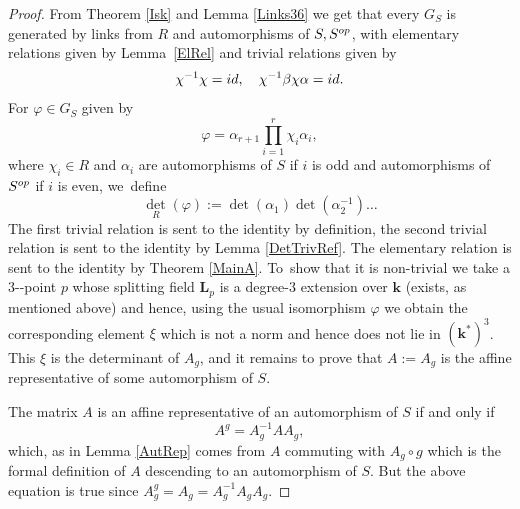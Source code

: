 \documentclass[10pt,a4paper]{amsart}
\providecommand{\nobreakdash}{\nobreak\hbox{-}}
\newcommand{\id}{\textup{id}}
\newcommand{\op}{\textup{op}}
\theoremstyle{definition}
\newcommand{\kk}{{\boldsymbol{k}}}
\newcommand{\LL}{{\boldsymbol{L}}}
\begin{document}
\begin{proof}
From Theorem \ref{Isk} and Lemma \ref{Links36} we get that every $G_S$ is generated by links from $R$ and automorphisms of $S,S^{\op}$, with elementary relations given by Lemma~\ref{ElRel} and trivial relations given by
\[
\chi^{-1} \chi = \id, \quad\chi^{-1} \beta \chi \alpha = \id.
\]
For $\varphi \in G_S$ given by
\[
\varphi = \alpha_{r+1}\prod_{i=1}^r\chi_i \alpha_i,
\]
where $\chi_i \in R$ and $\alpha_i$ are automorphisms of $S$ if $i$ is odd and automorphisms of $S^{\op}$ if $i$ is even, we~define
\[
\det_R(\varphi) := \det(\alpha_1) \det(\alpha_2^{-1}) \dots
\]
The first trivial relation is sent to the identity by definition, the second trivial relation is sent to the identity by Lemma \ref{DetTrivRef}. The elementary relation is sent to the identity by Theorem \ref{MainA}. To~show that it is non-trivial we take a $3$\nobreakdash-point $p$ whose splitting field $\LL_p$ is a degree-$3$ extension over $\kk$ (exists, as mentioned above) and hence, using the usual isomorphism $\varphi$ we obtain the corresponding element $\xi$ which is not a norm and hence does not lie in $(\kk^*)^3$. This $\xi$ is the determinant of $A_g$, and it remains to prove that $A := A_g$ is the affine representative of some automorphism of $S$.

The matrix $A$ is an affine representative of an automorphism of $S$ if and only if
\[
A^g = A_g^{-1} A A_g,
\]
which, as in Lemma \ref{AutRep} comes from $A$ commuting with $A_g \circ g$ which is the formal definition of $A$ descending to an automorphism of $S$. But the above equation is true since $A_g^g = A_g = A_g^{-1}A_g A_g$.
\end{proof}
\end{document}
